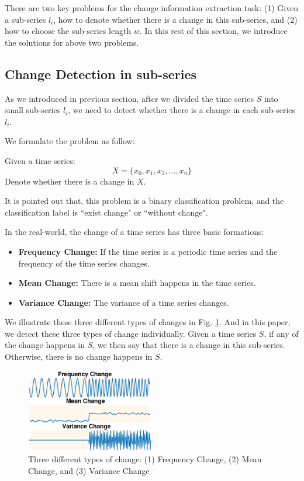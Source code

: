 There are two key problems for the change information extraction task: (1) Given a sub-series $l_i$, how to denote whether there is a change in this sub-series, and (2) how to choose the sub-series length $w$. In this rest of this section, we introduce the solutions for above two problems.

\subsection{Change Detection in sub-series}
\label{sec:changeDetect}

As we introduced in previous section, after we divided the time series $S$ into small sub-series $l_i$, we need to detect whether there is a change in each sub-series $l_i$.

We formulate the problem as follow:

\begin{definition}
Given a time series:
\[X = \{x_0,x_1,x_2,...,x_n\}\]
Denote whether there is a change in $X$.
\end{definition}
It is pointed out that, this problem is a binary classification problem, and the classification label is ``exist change" or ``without change".

In the real-world, the change of a time series has three basic formations: 
\begin{itemize}
  \item \textbf{Frequency Change:} If the time series is a periodic time series and the frequency of the time series changes. 
  \item \textbf{Mean Change:} There is a mean shift happens in the time series.
  \item \textbf{Variance Change:} The variance of a time series changes.
\end{itemize}
We illustrate these three different types of changes in Fig. \ref{fig:ChangeType}.
And in this paper, we detect these three types of change individually.
Given a time series $S$, if any of the change happens in $S$, we then say that there is a change in this sub-series. Otherwise, there is no change happens in $S$.
\begin{figure}[t]
\centering
\includegraphics[width=0.5\textwidth]{ChangeType.eps}
\caption{Three different types of change: (1) Frequency Change, (2) Mean Change, and (3) Variance Change}
\label{fig:ChangeType}
\end{figure}


